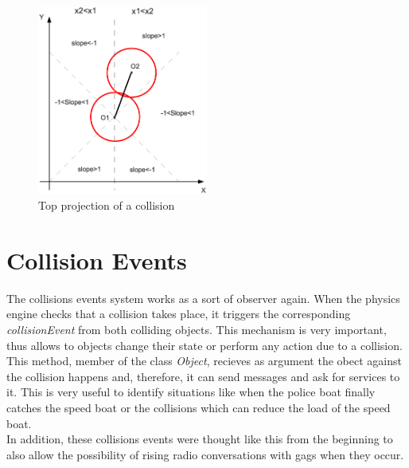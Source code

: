 \documentclass[]{article}
\begin{document}
\begin{figure}[!htb]
\begin{center}
\includegraphics[width=0.5\textwidth]{images/dofCalculation.eps}
\caption{Top projection of a collision}
\label{fig:dof}
\end{center}
\end{figure}




\section{Collision Events}

The collisions events system works as a sort of observer again. When the physics engine checks that a collision takes place, it triggers the corresponding \emph{collisionEvent} from both colliding objects.
This mechanism is very important, thus allows to objects change their state or perform any action due to a collision.\\

This method, member of the class \emph{Object}, recieves as argument the obect against the collision happens and, therefore, it can send messages and ask for services to it. This is very useful to identify situations
like when the police boat finally catches the speed boat or the collisions which can reduce the load of the speed boat.\\

In addition, these collisions events were thought like this from the beginning to also allow the possibility of rising radio conversations with gags when they occur.
\end{document}
